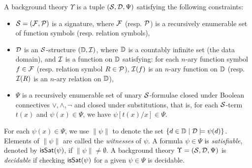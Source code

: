 
 \begin{definition}
A background theory $\Upsilon$ is a tuple $(\mathcal{S}, \mathcal{D}, \Psi)$ satisfying the following constraints:
\begin{itemize}
\item $\mathcal{S}=({\mathcal{F}}, {\mathcal{P}})$ is a signature, where ${\mathcal{F}}$ (resp. ${\mathcal{P}}$) is a recursively enumerable set of function symbols (resp. relation symbols), 
%

\item $\mathcal{D}$ is an $\mathcal{S}$-structure $(\mathbb{D}, \mathcal{I})$, where $\mathbb{D}$ is a countably infinite set (the data domain), and $\mathcal{I}$ is a function on $\mathbb{D}$ satisfying: for each $n$-ary function symbol $f \in {\mathcal{F}}$ (resp. relation symbol $R \in {\mathcal{P}}$), $\mathcal{I}(f)$ is an $n$-ary function on $\mathbb{D}$ (resp. $\mathcal{I}(R)$ is an $n$-ary relation on $\mathbb{D}$),
%
\item $\Psi$ is a recursively enumerable set of unary $\mathcal{S}$-formulae closed under Boolean connectives $\vee, \wedge, \neg$ and closed under substitutions, that is, for each $\mathcal{S}$-term $t(x)$ and $\psi(x) \in \Psi$, we have $\psi[t(x)/x] \in \Psi$. 
\end{itemize}
%
For each $\psi(x) \in \Psi$, we use $\|\psi\|$ to denote the set $\{d \in \mathbb{D} \mid  \mathcal{D} \models \psi(d)\}$. Elements of $\| \psi\|$ are called the \emph{witnesses} of $\psi$.
A formula $\psi \in \Psi$ is \emph{satisfiable}, denoted by $\mathsf{isSat}(\psi)$, if $\|\psi\| \neq \emptyset$. A background theory $\Upsilon = (\mathcal{S}, \mathcal{D}, \Psi)$ is \emph{decidable} if  checking  $\mathsf{isSat}(\psi)$ for a  given $\psi \in\Psi$ is decidable.
\end{definition}


